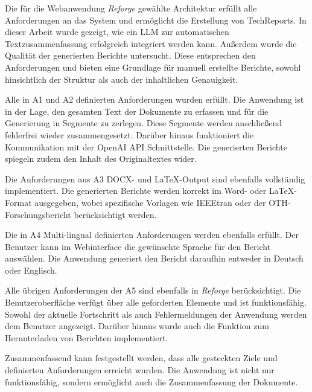 Die für die Webanwendung \textit{Reforge} gewählte Architektur erfüllt alle Anforderungen an das System und ermöglicht die Erstellung von TechReports. In dieser Arbeit wurde gezeigt, wie ein \ac{LLM} zur automatischen Textzusammenfassung erfolgreich integriert werden kann. Außerdem wurde die Qualität der generierten Berichte untersucht. Diese entsprechen den Anforderungen und bieten eine Grundlage für manuell erstellte Berichte, sowohl hinsichtlich der Struktur als auch der inhaltlichen Genauigkeit.

Alle in A1 und A2 definierten Anforderungen wurden erfüllt. Die Anwendung ist in der Lage, den gesamten Text der Dokumente zu erfassen und für die Generierung in Segmente zu zerlegen. Diese Segmente werden anschließend fehlerfrei wieder zusammengesetzt. Darüber hinaus funktioniert die Kommunikation mit der OpenAI \ac{API} Schnittstelle. Die generierten Berichte spiegeln zudem den Inhalt des Originaltextes wider.

Die Anforderungen aus A3 \ac{DOCX}- und LaTeX-Output sind ebenfalls vollständig implementiert. Die generierten Berichte werden korrekt im Word- oder LaTeX-Format ausgegeben, wobei spezifische Vorlagen wie IEEEtran oder der OTH-Forschungsbericht berücksichtigt werden.

Die in A4 Multi-lingual definierten Anforderungen werden ebenfalls erfüllt. Der Benutzer kann im Webinterface die gewünschte Sprache für den Bericht auswählen. Die Anwendung generiert den Bericht daraufhin entweder in Deutsch oder Englisch.  

Alle übrigen Anforderungen der A5 sind ebenfalls in \textit{Reforge} berücksichtigt. Die Benutzeroberfläche verfügt über alle geforderten Elemente und ist funktionsfähig. Sowohl der aktuelle Fortschritt als auch Fehlermeldungen der Anwendung werden dem Benutzer angezeigt. Darüber hinaus wurde auch die Funktion zum Herunterladen von Berichten implementiert.

Zusammenfassend kann festgestellt werden, dass alle gesteckten Ziele und definierten Anforderungen erreicht wurden. Die Anwendung ist nicht nur funktionsfähig, sondern ermöglicht auch die Zusammenfassung der Dokumente.